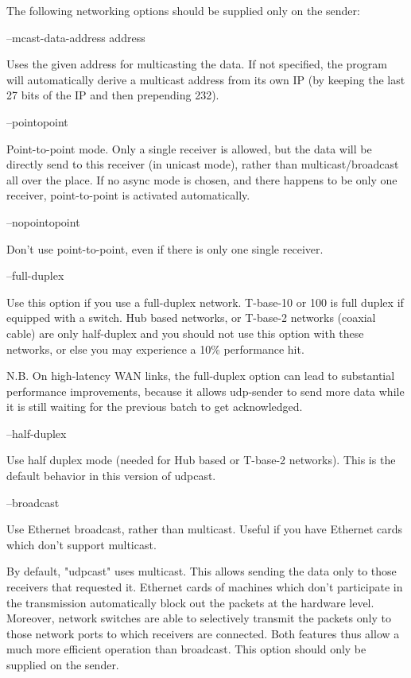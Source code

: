 The following networking options should be supplied only on the sender:

--mcast-data-address address

    Uses the given address for multicasting the data. If not specified, the
program will automatically derive a multicast address from its own IP (by
keeping the last 27 bits of the IP and then prepending 232).

--pointopoint

    Point-to-point mode. Only a single receiver is allowed, but the data
will be directly send to this receiver (in unicast mode), rather than
multicast/broadcast all over the place. If no async mode is chosen, and
there happens to be only one receiver, point-to-point is activated
automatically.

--nopointopoint

    Don't use point-to-point, even if there is only one single receiver.

--full-duplex

    Use this option if you use a full-duplex network. T-base-10 or 100 is
full duplex if equipped with a switch. Hub based networks, or T-base-2
networks (coaxial cable) are only half-duplex and you should not use this
option with these networks, or else you may experience a 10\% performance
hit.

    N.B. On high-latency WAN links, the full-duplex option can lead to
substantial performance improvements, because it allows udp-sender to send
more data while it is still waiting for the previous batch to get
acknowledged.

--half-duplex

    Use half duplex mode (needed for Hub based or T-base-2 networks). This
is the default behavior in this version of udpcast.

--broadcast

    Use Ethernet broadcast, rather than multicast. Useful if you have
Ethernet cards which don't support multicast.

    By default, "udpcast" uses multicast. This allows sending the data only
to those receivers that requested it. Ethernet cards of machines which
don't participate in the transmission automatically block out the packets
at the hardware level. Moreover, network switches are able to selectively
transmit the packets only to those network ports to which receivers are
connected. Both features thus allow a much more efficient operation than
broadcast. This option should only be supplied on the sender.

